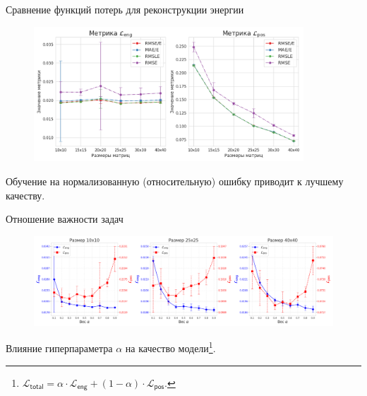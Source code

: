 \documentclass[9pt]{beamer}
\begin{document}
\begin{frame}{Сравнение функций потерь для реконструкции энергии}
    \begin{figure}
        \centering
        \includegraphics[width=0.9\textwidth]{../report/graphics/loss_comp_right.png}
    \end{figure}

    \begin{block}{}
        Обучение на нормализованную (относительную) ошибку приводит к лучшему качеству.
    \end{block}
\end{frame}

\begin{frame}{Отношение важности задач}
    \begin{figure}
        \centering
        \includegraphics[width=1.0\textwidth]{../report/graphics/exp3_alpha_std.png}
    \end{figure}

    \begin{block}{}
        Влияние гиперпараметра $\alpha$ на качество модели\footnote{$\mathcal{L}_{\mathsf{total}} = \alpha \cdot \mathcal{L}_{\mathsf{eng}} + (1 - \alpha) \cdot \mathcal{L}_{\mathsf{pos}}$.}.
    \end{block}
\end{frame}
\end{document}
